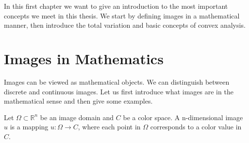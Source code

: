 In this first chapter we want to give an introduction to the most important concepts we meet in this thesis. We start by defining images in a mathematical manner, then introduce the total variation and basic concepts of convex analysis.

\section{Images in Mathematics} %
\label{sec:images_in_mathematics}

    Images can be viewed as mathematical objects. We can distinguish between discrete and continuous images. Let us first introduce what images are in the mathematical sense and then give some examples.

    \begin{definition}[Image] %
    \label{def:image}

        Let $\Omega \subset \mathbb{R}^{n}$ be an image domain and $C$ be a color space. A n-dimensional image $u$ is a mapping $u: \Omega \longrightarrow C$, where each point in $\Omega$ corresponds to a color value in $C$.

    \end{definition}

